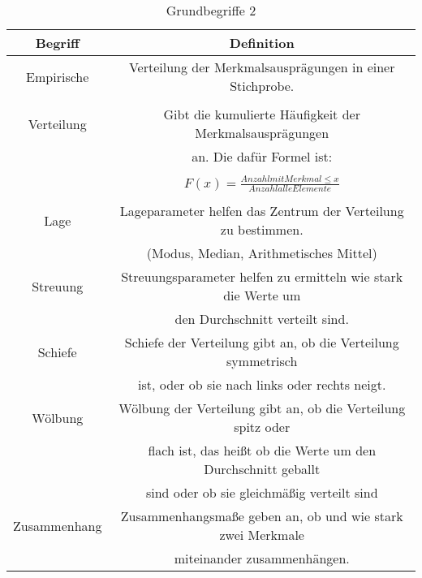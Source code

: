 \documentclass[12pt]{scrartcl}
\begin{document}
\begin{table}[h]
    \begin{tabular}{ | c | c | }
        \hline
        Begriff      & Definition                                                     \\
        \hline
        \hline
        Empirische   & Verteilung der Merkmalsausprägungen in einer Stichprobe.       \\&\\
        Verteilung   & Gibt die kumulierte Häufigkeit der Merkmalsausprägungen        \\
                     & an. Die dafür Formel ist:                                      \\&\\
                     & $F(x) =\frac{Anzahl mit Merkmal \leq x}
        {Anzahl alle Elemente}$                                                       \\&\\
        \hline
        Lage         & Lageparameter helfen das Zentrum der Verteilung zu  bestimmen. \\
                     & (Modus, Median, Arithmetisches Mittel)                         \\
        \hline
        Streuung     & Streuungsparameter helfen zu ermitteln wie stark die Werte um  \\
                     & den Durchschnitt verteilt sind.                                \\
        \hline
        Schiefe      & Schiefe der Verteilung gibt an, ob die Verteilung symmetrisch  \\
                     & ist, oder ob sie nach links oder rechts neigt.                 \\
        \hline
        Wölbung      & Wölbung der Verteilung gibt an, ob die Verteilung spitz oder   \\
                     & flach ist, das heißt ob die Werte um den Durchschnitt geballt  \\
                     & sind oder ob sie gleichmäßig verteilt sind                     \\
        \hline
        Zusammenhang & Zusammenhangsmaße geben an, ob und wie stark zwei Merkmale     \\
                     & miteinander zusammenhängen.                                    \\
        \hline
    \end{tabular}
    \caption{Grundbegriffe 2}
\end{table}
\end{document}
